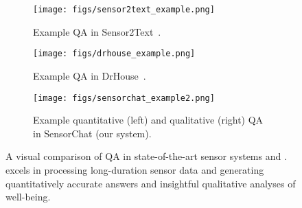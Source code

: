 \begin{figure}[t]
  \begin{subfigure}[b]{0.38\textwidth}
        \centering
        \texttt{[image: figs/sensor2text\_example.png]}
        \vspace{-6mm}
        \caption{Example QA in Sensor2Text~\cite{chen2024sensor2text}.}
        \label{fig:sensor2text_example}
    \end{subfigure} \hspace{0.05\textwidth} %
    \begin{subfigure}[b]{0.48\textwidth}
        \centering
        \texttt{[image: figs/drhouse\_example.png]}
        \vspace{-6mm}
        \caption{Example QA in DrHouse~\cite{yang2024drhouse}.}
        \label{fig:drhouse_example}
    \end{subfigure}

    \begin{subfigure}[b]{0.9\textwidth}
        \centering
        \texttt{[image: figs/sensorchat\_example2.png]}
        \vspace{-6mm}
        \caption{Example quantitative (left) and qualitative (right) QA in SensorChat (our system).}
        \label{fig:sensorchat_example}
    \end{subfigure}
    \vspace{-4mm}
    \caption{A visual comparison of QA in state-of-the-art sensor systems and \Method. \Method excels in processing long-duration sensor data and generating quantitatively accurate answers and insightful qualitative analyses of well-being.}
    \label{fig:moti_intro}
    \vspace{-6mm}
\end{figure}




